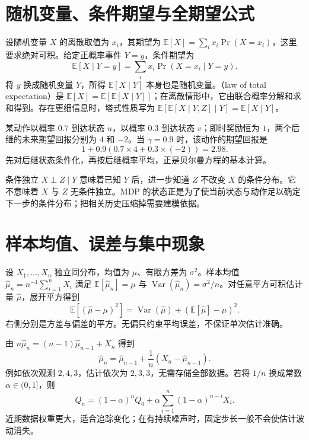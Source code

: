 \documentclass[UTF8,12pt,a4paper,fontset=fandol]{ctexbook}
\begin{document}
\section{随机变量、条件期望与全期望公式}

设随机变量 $X$ 的离散取值为 $x_i$，其期望为 $\mathbb E[X]=\sum_i x_i\Pr(X=x_i)$，这里要求绝对可积。给定正概率事件 $Y=y$，条件期望为
\[
\mathbb E[X\mid Y=y]=\sum_i x_i\Pr(X=x_i\mid Y=y).
\]
将 $y$ 换成随机变量 $Y$，所得 $\mathbb E[X\mid Y]$ 本身也是随机变量。（law of total expectation）是 $\mathbb E[X]=\mathbb E[\mathbb E[X\mid Y]]$；在离散情形中，它由联合概率分解和求和得到。存在更细信息时，塔式性质写为 $\mathbb E[\mathbb E[X\mid Y,Z]\mid Y]=\mathbb E[X\mid Y]$。

\begin{example}
某动作以概率 $0.7$ 到达状态 $u$，以概率 $0.3$ 到达状态 $v$；即时奖励恒为 $1$，两个后继的未来期望回报分别为 $4$ 和 $-2$。当 $\gamma=0.9$ 时，该动作的期望回报是
\[
1+0.9(0.7\times4+0.3\times(-2))=2.98.
\]
先对后继状态条件化，再按后继概率平均，正是贝尔曼方程的基本计算。
\end{example}

条件独立 $X\perp Z\mid Y$ 意味着已知 $Y$ 后，进一步知道 $Z$ 不改变 $X$ 的条件分布。它不意味着 $X$ 与 $Z$ 无条件独立。MDP 的状态正是为了使当前状态与动作足以确定下一步的条件分布；把相关历史压缩掉需要建模依据。

\section{样本均值、误差与集中现象}

设 $X_1,\ldots,X_n$ 独立同分布，均值为 $\mu$、有限方差为 $\sigma^2$。样本均值 $\widehat\mu_n=n^{-1}\sum_{i=1}^nX_i$ 满足 $\mathbb E[\widehat\mu_n]=\mu$ 与 $\operatorname{Var}(\widehat\mu_n)=\sigma^2/n$。对任意平方可积估计量 $\widehat\mu$，展开平方得到
\[
\mathbb E[(\widehat\mu-\mu)^2]
=\operatorname{Var}(\widehat\mu)+(\mathbb E[\widehat\mu]-\mu)^2.
\]
右侧分别是方差与偏差的平方。无偏只约束平均误差，不保证单次估计准确。

由 $n\widehat\mu_n=(n-1)\widehat\mu_{n-1}+X_n$ 得到
\begin{equation}
\widehat\mu_n=\widehat\mu_{n-1}+\frac1n(X_n-\widehat\mu_{n-1}).
\label{eq:rl-incremental-mean}
\end{equation}
例如依次观测 $2,4,3$，估计依次为 $2,3,3$，无需存储全部数据。若将 $1/n$ 换成常数 $\alpha\in(0,1]$，则
\[
Q_n=(1-\alpha)^nQ_0+\alpha\sum_{i=1}^n(1-\alpha)^{n-i}X_i.
\]
近期数据权重更大，适合追踪变化；在有持续噪声时，固定步长一般不会使估计波动消失。
\end{document}
